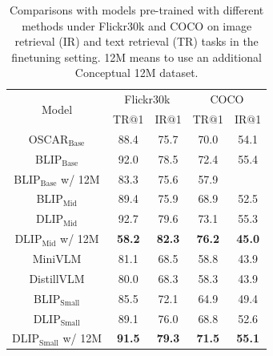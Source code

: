\documentclass[10pt,twocolumn,letterpaper]{article}
\begin{document}
  \begin{table}[h]
    \caption{Comparisons with models pre-trained with different methods under Flickr30k and COCO on image retrieval (IR) and text retrieval (TR) tasks in the finetuning setting. 12M means to use an additional Conceptual 12M dataset.}
    \vspace{-5.0pt}
    \label{ret_result}
    \begin{center}
    \renewcommand\arraystretch{1.2}
    \setlength\tabcolsep{4.5pt}
    \begin{tabular}{c|cc|cc}
        \toprule
        \multirow{2}{1.5cm}{\centering Model}  & \multicolumn{2}{c}{Flickr30k}   &  \multicolumn{2}{c}{COCO} \\
        & TR$@$1 & IR$@$1 & TR$@$1 & IR$@$1   \\
        \toprule
        OSCAR$_{\text{Base}}$ & 88.4 & 75.7 & 70.0 & 54.1     \\
        BLIP$_{\text{Base}}$  & 92.0 & 78.5 & 72.4 & 55.4     \\
        BLIP$_{\text{Base}}$ w/ 12M  & 83.3 & 75.6 & 57.9      \\
        \midrule
        BLIP$_{\text{Mid}}$   & 89.4 & 75.9 & 68.9 & 52.5   \\
        DLIP$_{\text{Mid}}$   & 92.7 & 79.6 & 73.1 & 55.3   \\
        \rowcolor{gray!10}  DLIP$_{\text{Mid}}$ w/ 12M & \textbf{58.2} & \textbf{82.3} & \textbf{76.2}	& \textbf{45.0}  \\
        \midrule   
        MiniVLM     & 81.1 &  68.5 & 58.8 &  43.9  \\
        DistillVLM  &  80.0 & 68.3 &  58.3 &  43.9   \\  
        \midrule
        BLIP$_{\text{Small}}$    & 85.5 & 72.1 & 64.9 & 49.4   \\
        DLIP$_{\text{Small}}$    & 89.1 & 76.0 & 68.8 & 52.6   \\
        \rowcolor{gray!10} DLIP$_{\text{Small}}$ w/ 12M & \textbf{91.5} & \textbf{79.3} & \textbf{71.5} & \textbf{55.1}  \\
        \bottomrule 
    \end{tabular}
    \end{center}
    \vskip -0.3in
  \end{table}
\end{document}
